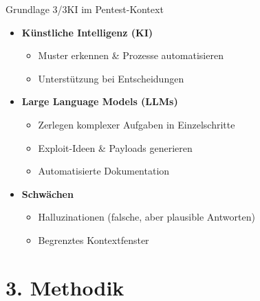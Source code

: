 \documentclass[
	aspectratio=169,	%
	onlytextwidth,		%
	t,					%
	]{beamer}
\begin{document}
\begin{frame}{Grundlage 3/3}{KI im Pentest-Kontext}
	\begin{itemize}
		\item \textbf{Künstliche Intelligenz (KI)}
		\begin{itemize}
			\item Muster erkennen \& Prozesse automatisieren
			\item Unterstützung bei Entscheidungen
		\end{itemize}
		
		\vspace{2mm}
		\item \textbf{Large Language Models (LLMs)}
		\begin{itemize}
			\item Zerlegen komplexer Aufgaben in Einzelschritte
			\item Exploit-Ideen \& Payloads generieren
			\item Automatisierte Dokumentation
		\end{itemize}
		
		\vspace{2mm}
		\item \textbf{Schwächen}
		\begin{itemize}
			\item Halluzinationen (falsche, aber plausible Antworten)
			\item Begrenztes Kontextfenster
		\end{itemize}
	\end{itemize}
\end{frame}


\section{3. Methodik}
\end{document}
